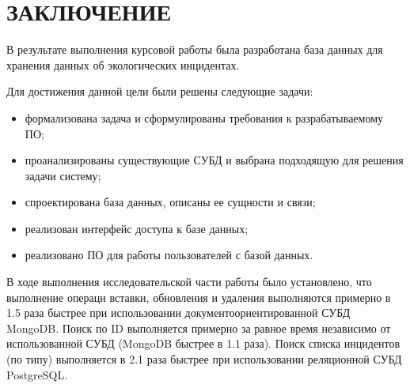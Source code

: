 \chapter*{ЗАКЛЮЧЕНИЕ}

В результате выполнения курсовой работы была разработана база данных для хранения данных об экологических инцидентах.

Для достижения данной цели были решены следующие задачи:
\begin{itemize}
	\item формализована задача и сформулированы требования к разрабатываемому ПО;
	\item проанализированы существующие СУБД и выбрана подходящую для решения задачи систему;
	\item спроектирована база данных, описаны ее сущности и связи;
	\item реализован интерфейс доступа к базе данных;
	\item реализовано ПО для работы пользователей с базой данных.
\end{itemize}  

В ходе выполнения исследовательской части работы было установлено, что выполнение операци вставки, обновления и удаления выполняются примерно в 1.5 раза быстрее при использовании документоориентированной СУБД MongoDB. Поиск по ID выполняется примерно за равное время независимо от использованной СУБД (MongoDB быстрее в 1.1 раза). Поиск списка инцидентов (по типу) выполняется в 2.1 раза быстрее при использовании реляционной СУБД PostgreSQL.  
 
